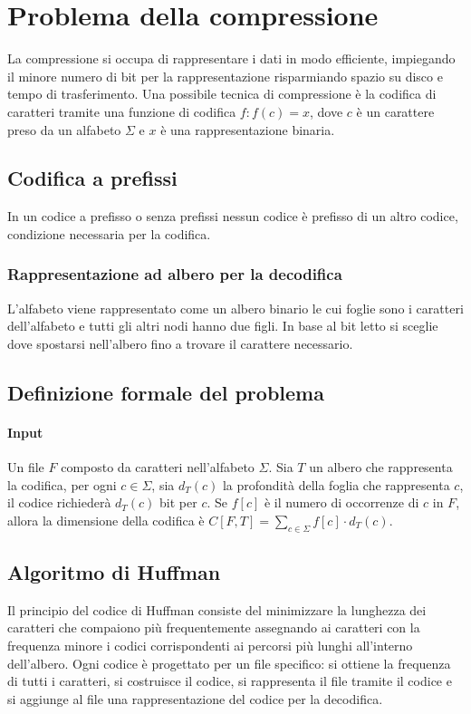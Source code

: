 \section{Problema della compressione}
La compressione si occupa di rappresentare i dati in modo efficiente, impiegando il minore numero di bit per la rappresentazione risparmiando spazio su disco e tempo di trasferimento.
Una possibile tecnica di compressione \`e la codifica di caratteri tramite una funzione di codifica $f:f(c) = x$, dove $c$ \`e un carattere preso da un alfabeto $\Sigma$ e $x$ \`e una
rappresentazione binaria. 
\subsection{Codifica a prefissi}
In un codice a prefisso o senza prefissi nessun codice \`e prefisso di un altro codice, condizione necessaria per la codifica. 
\subsubsection{Rappresentazione ad albero per la decodifica}
L'alfabeto viene rappresentato come un albero binario le cui foglie sono i caratteri dell'alfabeto e tutti gli altri nodi hanno due figli. In base al bit letto si sceglie dove spostarsi
nell'albero fino a trovare il carattere necessario.\\

\subsection{Definizione formale del problema}
\paragraph{Input}
Un file $F$ composto da caratteri nell'alfabeto $\Sigma$. Sia $T$ un albero che rappresenta la codifica, per ogni $c\in\Sigma$, sia $d_T(c)$ la profondit\`a della foglia che rappresenta
$c$, il codice richieder\`a $d_T(c)$ bit per $c$. Se $f[c]$ \`e il numero di occorrenze di $c$ in $F$, allora la dimensione della codifica \`e $C[F, T] = \sum\limits_{c\in\Sigma}f[c]
\cdot d_T(c)$.
\subsection{Algoritmo di Huffman}
Il principio del codice di Huffman consiste del minimizzare la lunghezza dei caratteri che compaiono pi\`u frequentemente assegnando ai caratteri con la frequenza minore i codici 
corrispondenti ai percorsi pi\`u lunghi all'interno dell'albero. Ogni codice \`e progettato per un file specifico: si ottiene la frequenza di tutti i caratteri, si costruisce il 
codice, si rappresenta il file tramite il codice e si aggiunge al file una rappresentazione del codice per la decodifica. 
